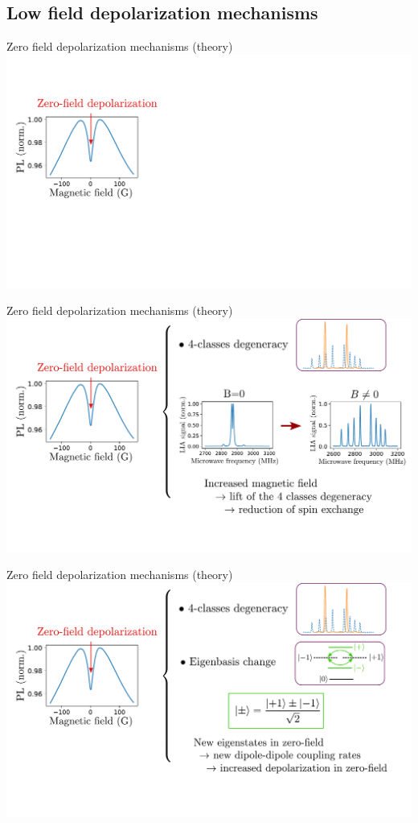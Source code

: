 \documentclass{beamer}
\begin{document}
\subsection{Low field depolarization mechanisms}
\begin{frame}{Zero field depolarization mechanisms (theory)}
\centering
\includegraphics[width=\textwidth,height=0.85\textheight,keepaspectratio]{Slide_0B_theorie_f-5}
\end{frame}

\begin{frame}{Zero field depolarization mechanisms (theory)}
\centering
\includegraphics[width=\textwidth,height=0.85\textheight,keepaspectratio]{Slide_0B_theorie_f-4}
\end{frame}

\begin{frame}{Zero field depolarization mechanisms (theory)}
\centering
\includegraphics[width=\textwidth,height=0.85\textheight,keepaspectratio]{Slide_0B_theorie_f-3}
\end{frame}
\end{document}
